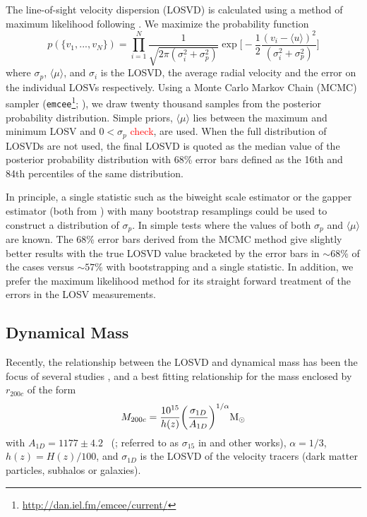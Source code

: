 \documentclass[fleqn,usenatbib]{mnras}
\newcommand{\editorial}[1]{\textcolor{red}{#1}}
\begin{document}
The line-of-sight velocity dispersion (LOSVD) is calculated using a method of maximum likelihood following \cite{Walker2006}. We maximize the probability function 
\begin{equation}
  \label{eq: jointGaussian}
p(\{v_1, ..., v_N\})=\displaystyle\prod_{i=1}^{N}\frac{1}{\sqrt{2\pi(\sigma_i^2+\sigma_p^2)}}\exp\biggl[-\frac{1}{2}\frac{(v_i-\langle u \rangle)^2}{(\sigma_i^2+\sigma_p^2)}\biggr]
\end{equation}
where $\sigma_p$, $\langle\mu\rangle$, and $\sigma_i$ is the LOSVD, the average radial velocity and the error on the individual LOSVs respectively. Using a Monte Carlo Markov Chain (MCMC) sampler ({\tt emcee}\footnote{\url{http://dan.iel.fm/emcee/current/}}; \citealt{Foreman-Mackey2013}), we draw twenty thousand samples from the posterior probability distribution. Simple priors, $\langle\mu\rangle$ lies between the maximum and minimum LOSV and $0< \sigma_p$ \editorial{check}, are used. When the full distribution of LOSVDs are not used, the final LOSVD is quoted as the median value of the posterior probability distribution with 68\% error bars defined as the 16th and 84th percentiles of the same distribution.

In principle, a single statistic such as the biweight scale estimator or the gapper estimator (both from \citealt{Beers1990}) with many bootstrap resamplings could be used to construct a distribution of $\sigma_p$. In simple tests where the values of both $\sigma_p$ and $\langle\mu\rangle$ are known. The 68\% error bars derived from the MCMC method give slightly better results with the true LOSVD value bracketed by the error bars in $\sim68\%$ of the cases versus $\sim57\%$ with bootstrapping and a single statistic. In addition, we prefer the maximum likelihood method for its straight forward treatment of the errors in the LOSV measurements.

\subsection{Dynamical Mass}\label{sec: mass}
Recently, the relationship between the LOSVD and dynamical mass has been the focus of several studies , and a best fitting relationship for the mass enclosed by $r_{200c}$ of the form
\begin{equation}\label{eq:power law}
	M_{200c} = \frac{10^{15}}{h(z)} \bigg{(}\frac{\sigma_{1D}}{A_{1D}} \bigg{)}^{1/\alpha} \hbox{$\mathrm{M}_\odot$}
\end{equation}
with $A_{1D} = 1177 \pm 4.2$ \kms\ (\citealt{Munari2013}; referred to as $\sigma_{15}$ in \citealt{Evrard2008} and other works), $\alpha = 1/3$, $h(z) = H(z)/100$, and $\sigma_{1D}$ is the LOSVD of the velocity tracers (dark matter particles, subhalos or galaxies). 
\end{document}
